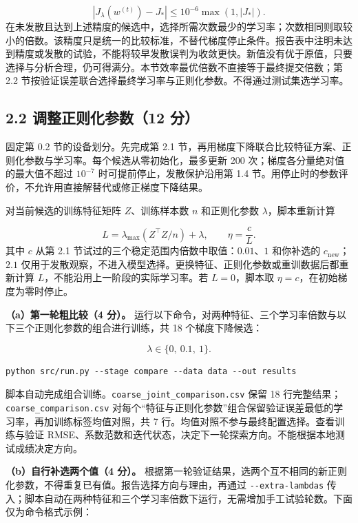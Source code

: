 \documentclass[11pt,a4paper]{article}
\newcommand{\code}[1]{{\small\nolinkurl{#1}}}
\begin{document}
\[
\left|J_\lambda(w^{(t)})-J_*\right|
\leq 10^{-6}\max(1,|J_*|).
\]
在未发散且达到上述精度的候选中，选择所需次数最少的学习率；次数相同则取较小的倍数。该精度只是统一的比较标准，不替代梯度停止条件。报告表中注明未达到精度或发散的试验，不能将较早发散误判为收敛更快。新值没有优于原值，只要选择与分析合理，仍可得满分。本节效率最优倍数不直接等于最终提交倍数；第 2.2 节按验证误差联合选择最终学习率与正则化参数。不得通过测试集选学习率。


\subsection*{2.2 调整正则化参数（12 分）}
固定第 0.2 节的设备划分。先完成第 2.1 节，再用梯度下降联合比较特征方案、正则化参数与学习率。每个候选从零初始化，最多更新 200 次；梯度各分量绝对值的最大值不超过 $10^{-7}$ 时可提前停止，发散保护沿用第 1.4 节。用停止时的参数评价，不允许用直接解替代或修正梯度下降结果。

对当前候选的训练特征矩阵 $Z$、训练样本数 $n$ 和正则化参数 $\lambda$，脚本重新计算


\[
L=\lambda_{\max}(Z^\top Z/n)+\lambda,\qquad
\eta=\frac{c}{L}.
\]
其中 $c$ 从第 2.1 节试过的三个稳定范围内倍数中取值：$0.01$、$1$ 和你补选的 $c_{\mathrm{new}}$；$2.1$ 仅用于发散观察，不进入模型选择。更换特征、正则化参数或重训数据后都重新计算 $L$，不能沿用上一阶段的实际学习率。若 $L=0$，脚本取 $\eta=c$，在初始梯度为零时停止。

\textbf{（a）第一轮粗比较（4 分）。} 运行以下命令，对两种特征、三个学习率倍数与以下三个正则化参数的组合进行训练，共 18 个梯度下降候选：


\[
\lambda\in\{0,\ 0.1,\ 1\}.
\]

\par{}\noindent\begin{minipage}{\linewidth}
\begin{lstlisting}[aboveskip=0pt,belowskip=0pt]
python src/run.py --stage compare --data data --out results
\end{lstlisting}
\end{minipage}\par{}
脚本自动完成组合训练。\code{coarse_joint_comparison.csv} 保留 18 行完整结果；\code{coarse_comparison.csv} 对每个“特征与正则化参数”组合保留验证误差最低的学习率，再加训练标签均值对照，共 7 行。均值对照不参与最终配置选择。查看训练与验证 RMSE、系数范数和迭代状态，决定下一轮探索方向。不能根据本地测试成绩决定方向。

\textbf{（b）自行补选两个值（4 分）。} 根据第一轮验证结果，选两个互不相同的新正则化参数，不得重复已有值。报告选择方向与理由，再通过 \code{--extra-lambdas} 传入；脚本自动在两种特征和三个学习率倍数下运行，无需增加手工试验轮数。下面仅为命令格式示例：
\end{document}
